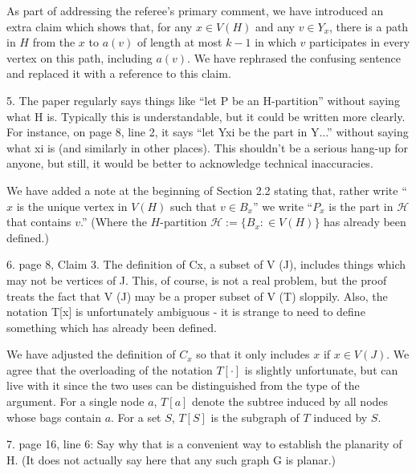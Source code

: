 \documentclass[12pt]{article}
\newenvironment{response}{\color{blue}}{}
\begin{document}
\begin{response}
  As part of addressing the referee's primary comment, we have introduced an extra claim which shows that, for any $x\in V(H)$ and any $v\in Y_x$, there is a path in $H$ from the $x$ to $a(v)$ of length at most $k-1$ in which $v$ participates in every vertex on this path, including $a(v)$.  We have rephrased the confusing sentence and replaced it with a reference to this claim.
\end{response}


5. The paper regularly says things like “let P be an H-partition” without
saying what H is. Typically this is understandable, but it could be
written more clearly. For instance, on page 8, line 2, it says “let Yxi
be the part in Y...” without saying what xi
is (and similarly in other
places). This shouldn’t be a serious hang-up for anyone, but still, it
would be better to acknowledge technical inaccuracies.

\begin{response}
  We have added a note at the beginning of Section 2.2 stating that, rather write ``$x$ is the unique vertex in $V(H)$ such that $v\in B_x$'' we write
  ``$P_x$ is the part in $\mathcal{H}$ that contains $v$.''  (Where the $H$-partition $\mathcal{H}:=\{B_x:\in V(H)\}$ has already been defined.)
\end{response}

6. page 8, Claim 3. The definition of Cx, a subset of V (J), includes things
which may not be vertices of J. This, of course, is not a real problem,
but the proof treats the fact that V (J) may be a proper subset of
V (T) sloppily. Also, the notation T[x] is unfortunately ambiguous - it
is strange to need to define something which has already been defined.

\begin{response}
  We have adjusted the definition of $C_x$ so that it only includes $x$ if $x\in V(J)$.  We agree that the overloading of the notation $T[\cdot]$ is slightly unfortunate, but can live with it since the two uses can be distinguished from the type of the argument.  For a single node $a$, $T[a]$ denote the subtree induced by all nodes whose bags contain $a$. For a set $S$, $T[S]$ is the subgraph of $T$ induced by $S$.
\end{response}

7. page 16, line 6: Say why that is a convenient way to establish the
planarity of H. (It does not actually say here that any such graph G
is planar.)
\end{document}
